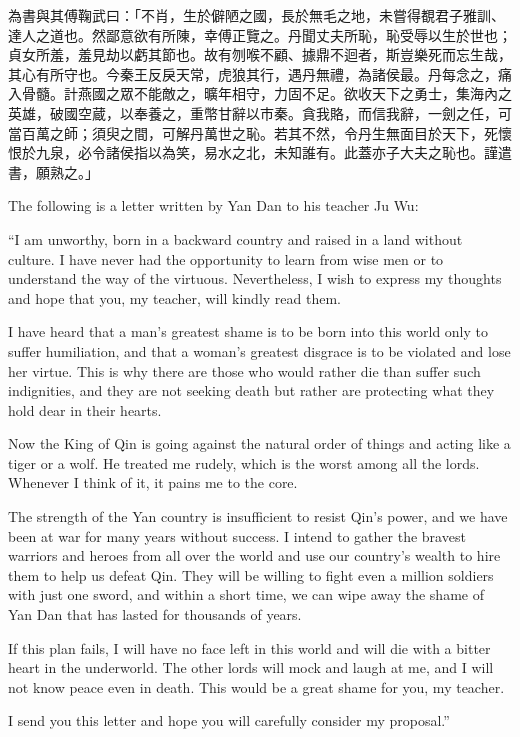 \documentclass[12pt]{book}
\begin{document}
\begin{pairs}
\begin{Rightside}
\begin{chinese}
\beginnumbering
\pstart
為書與其傅鞠武曰：「不肖，生於僻陋之國，長於無毛之地，未嘗得覩君子雅訓、達人之道也。然鄙意欲有所陳，幸傅正覽之。丹聞丈夫所恥，恥受辱以生於世也；貞女所羞，羞見劫以虧其節也。故有刎喉不顧、據鼎不迴者，斯豈樂死而忘生哉，其心有所守也。今秦王反戾天常，虎狼其行，遇丹無禮，為諸侯最。丹每念之，痛入骨髓。計燕國之眾不能敵之，曠年相守，力固不足。欲收天下之勇士，集海內之英雄，破國空蔵，以奉養之，重幣甘辭以巿秦。貪我賂，而信我辭，一劍之任，可當百萬之師；須臾之間，可解丹萬世之恥。若其不然，令丹生無面目於天下，死懷恨於九泉，必令諸侯指以為笑，易水之北，未知誰有。此蓋亦子大夫之恥也。謹遣書，願熟之。」
\pend
\endnumbering
\end{chinese}
\end{Rightside}
\begin{Leftside}
\begin{fioesjfsoeifj}
\beginnumbering
\pstart
The following is a letter written by Yan Dan to his teacher Ju Wu:

``I am unworthy, born in a backward country and raised in a land without culture. I have never had the opportunity to learn from wise men or to understand the way of the virtuous. Nevertheless, I wish to express my thoughts and hope that you, my teacher, will kindly read them.

I have heard that a man's greatest shame is to be born into this world only to suffer humiliation, and that a woman's greatest disgrace is to be violated and lose her virtue. This is why there are those who would rather die than suffer such indignities, and they are not seeking death but rather are protecting what they hold dear in their hearts.

Now the King of Qin is going against the natural order of things and acting like a tiger or a wolf. He treated me rudely, which is the worst among all the lords. Whenever I think of it, it pains me to the core.

The strength of the Yan country is insufficient to resist Qin's power, and we have been at war for many years without success. I intend to gather the bravest warriors and heroes from all over the world and use our country's wealth to hire them to help us defeat Qin. They will be willing to fight even a million soldiers with just one sword, and within a short time, we can wipe away the shame of Yan Dan that has lasted for thousands of years.

If this plan fails, I will have no face left in this world and will die with a bitter heart in the underworld. The other lords will mock and laugh at me, and I will not know peace even in death. This would be a great shame for you, my teacher.

I send you this letter and hope you will carefully consider my proposal.''
\pend
\endnumbering
\end{fioesjfsoeifj}
\end{Leftside}
\end{pairs}
\end{document}
